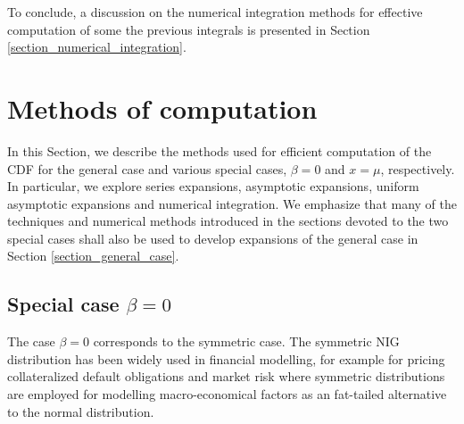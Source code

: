 \documentclass[10pt,a4paper,oneside]{article}
\numberwithin{equation}{section}
\begin{document}
To conclude, a discussion on the numerical integration methods for effective computation of some the previous integrals is presented in Section \ref{section_numerical_integration}.

%
%

\section{Methods of computation}\label{section_methods_of_computation}
In this Section, we describe the methods used for efficient computation of the CDF for the general case and various special cases, $\beta = 0$ and $x=\mu$, respectively. In particular, we explore series expansions, asymptotic expansions, uniform asymptotic expansions and numerical integration. We emphasize that many of the techniques and numerical methods introduced in the sections devoted to the two special cases shall also be used to develop expansions of the general case in Section \ref{section_general_case}.


\subsection{Special case $\beta = 0$}\label{section_special_case_beta_0}
The case $\beta = 0$ corresponds to the symmetric case. The symmetric NIG distribution has been widely used in financial modelling, for example for pricing collateralized default obligations \cite{Kalemanova2007} and market risk \cite{Prause1999} where symmetric distributions are employed for modelling macro-economical factors as an fat-tailed alternative to the normal distribution.
\end{document}
